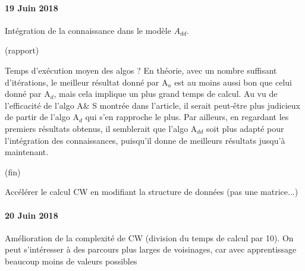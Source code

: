 \documentclass[a4paper,11pt]{article}%
\begin{document}
\paragraph*{19 Juin 2018}
Intégration de la connaissance dans le modèle $A_{dd}$. 

(rapport)

Temps d'exécution moyen des algos ?
En théorie, avec un nombre suffisant d'itérations, le meilleur résultat donné par A$_a$ est au moins aussi bon que celui donné par A$_d$, mais cela implique un plus grand temps de calcul.
Au vu de l'efficacité de l'algo A\& S montrée dans l'article, il serait peut-être plus judicieux de partir de l'algo A$_d$ qui s'en rapproche le plus. Par ailleurs, en regardant les premiers résultats obtenus, il semblerait que l'algo A$_{dd}$ soit plus adapté pour l'intégration des connaissances, puisqu'il donne de meilleurs résultats jusqu'à maintenant. 

(fin)

Accélérer le calcul CW en modifiant la structure de données (pas une matrice...)

\paragraph*{20 Juin 2018}
Amélioration de la complexité de CW (division du temps de calcul par 10). On peut s'intéresser à des parcours plus larges de voisinages, car avec apprentissage beaucoup moins de valeurs possibles
\end{document}
